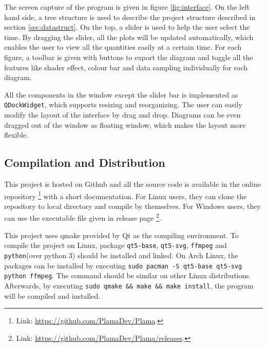 The screen capture of the program is given in figure \ref{fig:interface}. On the left hand side, a tree structure is used to describe the project structure described in section \ref{sec:datastruct}. On the top, a slider is used to help the user select the time. By dragging the slider, all the plots will be updated automatically, which enables the user to view all the quantities easily at a certain time. For each figure, a toolbar is given with buttons to export the diagram and toggle all the features like shader effect, colour bar and data sampling individually for each diagram.

All the components in the window except the slider bar is implemented as \lstinline{QDockWidget}, which supports resizing and reorganizing. The user can easily modify the layout of the interface by drag and drop. Diagrams can be even dragged out of the window as floating window, which makes the layout more flexible.

\subsection{Compilation and Distribution}

This project is hosted on Github and all the source code is available in the online repository \footnote{Link: \url{https://github.com/PlamaDev/Plama}.} with a short documentation. For Linux users, they can clone the repository to local directory and compile by themselves. For Windows users, they can use the executable file given in release page \footnote{Link: \url{https://github.com/PlamaDev/Plama/releases}.}.

This project uses qmake provided by Qt as the compiling environment. To compile the project on Linux, package \lstinline{qt5-base}, \lstinline{qt5-svg}, \lstinline{ffmpeg} and \lstinline{python}(over python 3) should be installed and linked. On Arch Linux, the packages can be installed by executing \lstinline{sudo pacman -S qt5-base qt5-svg python ffmpeg}. The command should be similar on other Linux distributions. Afterwards, by executing \lstinline{sudo qmake && make && make install}, the program will be compiled and installed.


